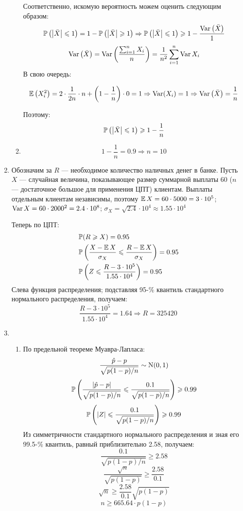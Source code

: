 \begin{enumerate}
\begin{enumerate}
Соответственно, искомую вероятность можем оценить следующим образом:
\[
\P\left(\left|\bar{X}\right| \leqslant 1\right) = 1 -\P\left(\left|\bar{X}\right| \geqslant 1\right) \Rightarrow \P\left(\left|\bar{X}\right| \leqslant 1\right) \geqslant 1 - \frac{\Var\left(\bar{X}\right)}{1}
\]
\[
\Var\left(\bar{X}\right) = \Var\left(\frac{\sum_{i=1}^{n} X_i}{n}\right) = \frac{1}{n^2}\sum _{i=1}^{n} \Var{X_i}
\]
В свою очередь:

\[
\E\left(X_i^2\right) = 2\cdot\frac{1}{2n}\cdot n + \left(1-\frac{1}{n}\right)\cdot0 = 1 \Rightarrow \Var(X_i) = 1 \Rightarrow \Var\left(\bar{X}\right) = \frac{1}{n}
\]

Поэтому:
\[
\P\left(\left|\bar{X}\right| \leqslant 1 \right) \geqslant 1 - \frac{1}{n}
\]

\item
\[
1 - \frac{1}{n} = 0.9  \Rightarrow n = 10
\]

\end{enumerate}

\item

Обозначим за $R$ — необходимое количество наличных денег в банке. 
Пусть $X$ — случайная величина, показывающее размер суммарной выплаты $60$ 
($n$ — достаточное большое для применения ЦПТ) клиентам. 
Выплаты отдельным клиентам независимы, 
поэтому \( \E X = 60 \cdot 5000 = 3\cdot 10^5 \); \( \Var X = 60 \cdot 2000^2 = 2.4 \cdot 10^8 \); 
\( \sigma_X = \sqrt{2.4} \cdot 10^4 \approx 1.55 \cdot 10^4\)

Теперь по ЦПТ:
\begin{align*}
&\P(R \geqslant X) = 0.95 \\
&\P \left(\frac{X - \E X}{\sigma_X} \leqslant \frac{R - \E X}{\sigma_X} \right) = 0.95 \\
&\P \left( Z \leqslant \frac{R - 3 \cdot 10^5}{1.55 \cdot 10^4} \right) = 0.95
\end{align*}
Слева функция распределения; подставляя 95-\% квантиль стандартного нормального распределения, получаем:
\[
\frac{R - 3 \cdot 10^5}{1.55 \cdot 10^4} = 1.64 \Rightarrow R = 325420
\]


\item

\begin{enumerate}
\item По предельной теореме Муавра-Лапласа:
\[ \frac{\hat{p} - p}{\sqrt{p(1-p)/n}} \sim \cN (0,1) \]
\[ \P \left( \frac{|\hat{p} - p|}{\sqrt{p(1-p)/n}} \leqslant \frac{0.1}{\sqrt{p(1-p)/n}} \right) \geqslant 0.99 \]
\[ \P \left( |Z| \leqslant \frac{0.1}{\sqrt{p(1-p)/n}} \right) \geqslant 0.99 \]
Из симметричности стандартного нормального распределения и зная его 99.5-\% квантиль, равный приблизительно 2.58, получаем:
\[ \frac{0.1}{\sqrt{p(1-p)/n}} \geqslant 2.58 \]
\[ \frac{\sqrt{n}}{\sqrt{p(1-p)}} \geqslant \frac{2.58}{0.1} \]
\[ \sqrt{n} \geqslant \frac{2.58}{0.1} \sqrt{p(1-p)} \]
\[ n \geqslant 665.64 \cdot p(1-p) \]


\end{enumerate}
\end{enumerate}
